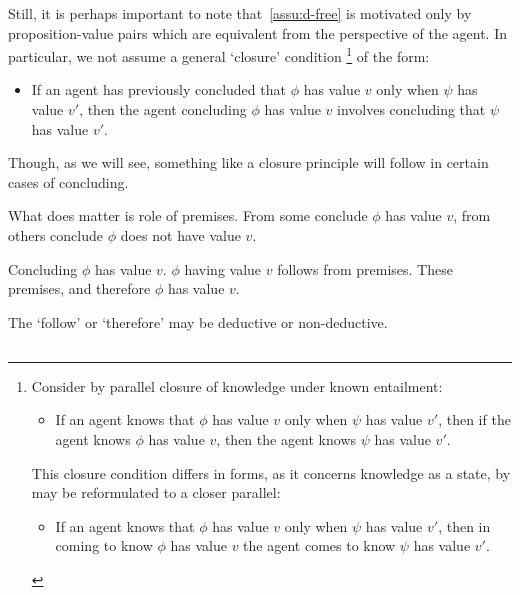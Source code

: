 \begin{note}[Descriptions]
  Still, it is perhaps important to note that~\autoref{assu:d-free} is motivated only by proposition-value pairs which are equivalent from the perspective of the agent.
  In particular, we not assume a general `closure' condition%
  \footnote{
    Consider by parallel closure of knowledge under known entailment:
    \begin{itemize}
    \item If an agent knows that \(\phi\) has value \(v\) only when \(\psi\) has value \(v'\), then if the agent knows \(\phi\) has value \(v\), then the agent knows \(\psi\) has value \(v'\).
    \end{itemize}
    This closure condition differs in forms, as it concerns knowledge as a state, by may be reformulated to a closer parallel:
        \begin{itemize}
    \item If an agent knows that \(\phi\) has value \(v\) only when \(\psi\) has value \(v'\), then in coming to know \(\phi\) has value \(v\) the agent comes to know \(\psi\) has value \(v'\).
    \end{itemize}
  }
  of the form:
  \begin{itemize}
  \item If an agent has previously concluded that \(\phi\) has value \(v\) only when \(\psi\) has value \(v'\), then the agent concluding \(\phi\) has value \(v\) involves concluding that \(\psi\) has value \(v'\).
  \end{itemize}

  Though, as we will see, something like a closure principle will follow in certain cases of concluding.
\end{note}

\begin{note}
  What does matter is role of premises.
  From some conclude \(\phi\) has value \(v\), from others conclude \(\phi\) does not have value \(v\).
\end{note}

\begin{note}[Generally]
  Concluding \(\phi\) has value \(v\).
  \(\phi\) having value \(v\) follows from premises.
  These premises, and therefore \(\phi\) has value \(v\).

  The `follow' or `therefore' may be deductive or non-deductive.
\end{note}

\subsection{}
\label{sec:csn2}


